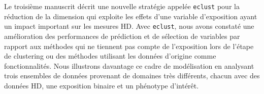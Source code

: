 \documentclass[12pt,letterpaper]{report}
\begin{document}
\begin{romanPagenumber}{2}
{Le troisième manuscrit décrit une nouvelle stratégie appelée \texttt{eclust} pour la réduction de la dimension qui exploite les effets d'une variable d'exposition ayant un impact important sur les mesures HD. Avec \texttt{eclust}, nous avons constaté une amélioration des performances de prédiction et de sélection de variables par rapport aux méthodes qui ne tiennent pas compte de l'exposition lors de l'étape de clustering ou des méthodes utilisant les données d'origine comme fonctionnalités. Nous illustrons davantage ce cadre de modélisation en analysant trois ensembles de données provenant de domaines très différents, chacun avec des données HD, une exposition binaire et un phénotype d'intérêt.
	}
	\AbstractFr
	
	
	\tableofcontents 

	\listoftables 
	\listoffigures
	
	\newpage
	
	\printacronyms[include-classes=abbrev,name=Abbreviations]
	\end{romanPagenumber}

\else
\fi


\doublespacing

\ifthesis
	
	
	
	
	
	
	
\else
	
	
	
	
	
	
	
\fi


\ifthesis
\else
\fi
	

%
\end{document}
